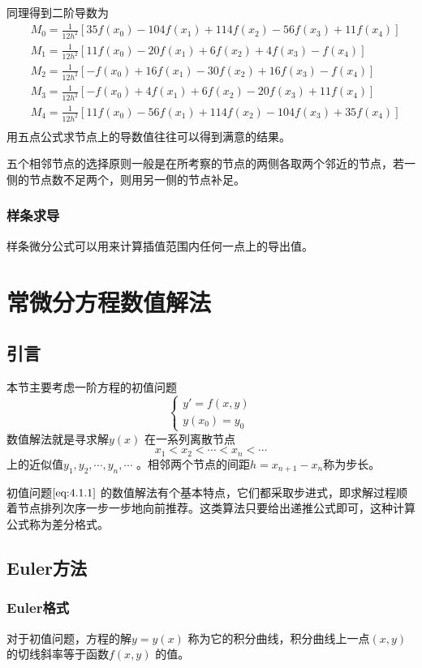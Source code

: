\documentclass[a4paper]{article}
\begin{document}
同理得到二阶导数为
\[
\begin{align*}
& M_0 = \frac{1}{12 h^2} [35 f(x_0) - 104 f(x_1) + 114 f(x_2) - 56 f(x_3) + 11 f(x_4)] \\	
& M_1 = \frac{1}{12 h^2} [11 f(x_0) - 20 f(x_1) + 6 f(x_2) + 4 f(x_3) - f(x_4)] \\	
& M_2 = \frac{1}{12 h^2} [-f(x_0) + 16 f(x_1) - 30 f(x_2) + 16 f(x_3) - f(x_4)] \\	
& M_3 = \frac{1}{12 h^2} [-f(x_0) + 4 f(x_1) + 6 f(x_2) - 20 f(x_3) + 11 f(x_4)] \\	
& M_4 = \frac{1}{12 h^2} [11 f(x_0) - 56 f(x_1) + 114 f(x_2) - 104 f(x_3) + 35 f(x_4)] \\	
\end{align*}
\] 
用五点公式求节点上的导数值往往可以得到满意的结果。

五个相邻节点的选择原则一般是在所考察的节点的两侧各取两个邻近的节点，若一侧的节点数不足两个，则用另一侧的节点补足。

\subsubsection{样条求导}
样条微分公式可以用来计算插值范围内任何一点上的导出值。

\section{常微分方程数值解法}
\subsection{引言}
本节主要考虑一阶方程的初值问题
\[
	\tag{4.1.1} \label{eq:4.1.1} 
\begin{cases}
	y' = f(x,y) \\
	y(x_0) = y_0
\end{cases} 
\] 
数值解法就是寻求解$y(x)$ 在一系列离散节点
\[
x_1 < x_2 < \cdots < x_{n} < \cdots
\] 
上的近似值$y_1,  y_2, \cdots, y_{n}, \cdots$ 。相邻两个节点的间距$h = x_{n+1} - x_{n}$称为步长。

初值问题$\ref{eq:4.1.1}$ 的数值解法有个基本特点，它们都采取步进式，即求解过程顺着节点排列次序一步一步地向前推荐。这类算法只要给出递推公式即可，这种计算公式称为差分格式。

\subsection{Euler方法}
\subsubsection{Euler格式}
对于初值问题，方程的解$y = y(x)$ 称为它的积分曲线，积分曲线上一点$(x,y)$ 的切线斜率等于函数$f(x,y)$ 的值。
\end{document}
